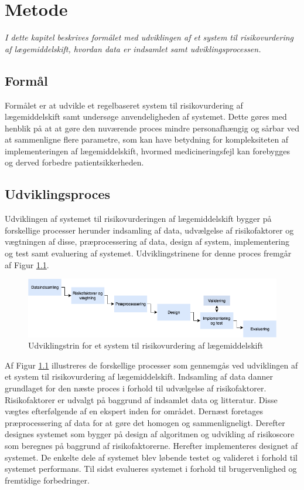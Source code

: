 \chapter{Metode}
\textit{I dette kapitel beskrives formålet med udviklingen af et system til risikovurdering af lægemiddelskift, hvordan data er indsamlet samt udviklingsprocessen.}

\section{Formål}
Formålet er at udvikle et regelbaseret system til risikovurdering af lægemiddelskift samt undersøge anvendeligheden af systemet. Dette gøres med henblik på at at gøre den nuværende proces mindre personafhængig og sårbar ved at sammenligne flere parametre, som kan have betydning for kompleksiteten af implementeringen af lægemiddelskift, hvormed medicineringsfejl kan forebygges og derved forbedre patientsikkerheden.  

\section{Udviklingsproces}
Udviklingen af systemet til risikovurderingen af lægemiddelskift bygger på forskellige processer herunder indsamling af data, udvælgelse af risikofaktorer og vægtningen af disse, præprocessering af data, design af system, implementering og test samt evaluering af systemet. Udviklingstrinene for denne proces fremgår af Figur \ref{fig:metode}.

\begin{figure}[H]\centering	\includegraphics[width=1\textwidth]{billeder/udviklingstrin.png} 
	\caption{Udviklingstrin for et system til risikovurdering af lægemiddelskift}
	\label{fig:metode}  
\end{figure}
\vspace{-0.5cm}

Af Figur \ref{fig:metode} illustreres de forskellige processer som gennemgås ved udviklingen af et system til risikovurdering af lægemiddelskift. Indsamling af data danner grundlaget for den næste proces i forhold til udvælgelse af risikofaktorer. Risikofaktorer er udvalgt på baggrund af indsamlet data og litteratur. Disse vægtes efterfølgende af en ekspert inden for området. Dernæst foretages præprocessering af data for at gøre det homogen og sammenligneligt. Derefter designes systemet som bygger på design af algoritmen og udvikling af risikoscore som beregnes på baggrund af risikofaktorerne. Herefter implementeres designet af systemet. De enkelte dele af systemet blev løbende testet og valideret i forhold til systemet performans. Til sidst evalueres systemet i forhold til brugervenlighed og fremtidige forbedringer. 


